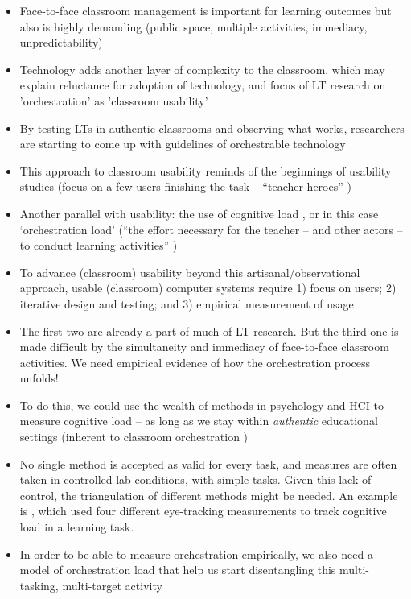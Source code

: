 \documentclass[10pt,journal,compsoc]{IEEEtran}
\begin{document}
\begin{itemize}
\item Face-to-face classroom management is important for learning outcomes but also is highly demanding (public space, multiple activities, immediacy, unpredictability) \cite{Doyle2006}
\item Technology adds another layer of complexity to the classroom, which may explain reluctance for adoption of technology, and focus of LT research on 'orchestration' as 'classroom usability' \cite{Dillenbourg2011}
\item By testing LTs in authentic classrooms and observing what works, researchers are starting to come up with guidelines of orchestrable technology \cite{Cuendet2013,Dillenbourg2013,Kharrufa2013,Kreitmayer2013}
\item This approach to classroom usability reminds of the beginnings of usability studies \cite{Webusability} (focus on a few users finishing the task -- ``teacher heroes'' \cite{Dillenbourg2009b})
\item Another parallel with usability: the use of cognitive load \cite{Paas2004}, or in this case `orchestration load' (``the effort necessary for the teacher -- and other actors -- to conduct learning activities'' \cite{Cuendet2013}) \cite{Dillenbourg2013}
\item To advance (classroom) usability beyond this artisanal/observational approach, usable (classroom) computer systems require 1) focus on users; 2) iterative design and testing; and 3) empirical measurement of usage \cite{Gould1985}
\item The first two are already a part of much of LT research. But the third one is made difficult by the simultaneity and immediacy of face-to-face classroom activities. We need empirical evidence of how the orchestration process unfolds!
\item To do this, we could use the wealth of methods in psychology and HCI to measure cognitive load \cite{Brunken2003} -- as long as we stay within \textit{authentic} educational settings (inherent to classroom orchestration \cite{Roschelle2013})
\item No single method is accepted as valid for every task, and measures are often taken in controlled lab conditions, with simple tasks. Given this lack of control, the triangulation of different methods might be needed. An example is \cite{Buettner2013}, which used four different eye-tracking measurements to track cognitive load in a learning task.
\item In order to be able to measure orchestration empirically, we also need a model of orchestration load that help us start disentangling this multi-tasking, multi-target activity 
\end{itemize}
\end{document}
